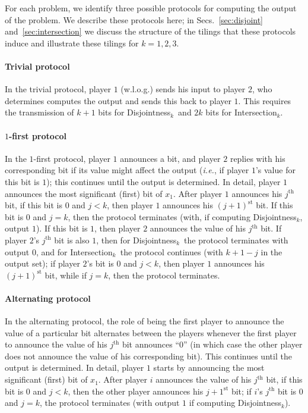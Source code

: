 \documentclass{article}
\theoremstyle{theorem}
\theoremstyle{definition}
\theoremstyle{remark}
\newcommand{\ie}{\emph{i.e.}}
\newcommand{\disjoint}{{\sc Dis\-joint\-ness}\ensuremath{_k}}
\newcommand{\intersection}{{\sc In\-ter\-sec\-tion}\ensuremath{_k}}
\begin{document}
For each problem, we identify three possible protocols for computing the output of the problem.  We describe these protocols here; in Secs.~\ref{sec:disjoint} and~\ref{sec:intersection} we discuss the structure of the tilings that these protocols induce and illustrate these tilings for $k=1,2,3$.



\paragraph{Trivial protocol} In the trivial protocol, player $1$ (w.l.o.g.) sends his input to player $2$, who determines computes the output and sends this back to player $1$.  This requires the transmission of $k+1$ bits for \disjoint\ and $2k$ bits for \intersection.


\paragraph{$1$-first protocol} In the $1$-first protocol, player $1$ announces a bit, and player $2$ replies with his corresponding bit if its value might affect the output (\ie, if player $1$'s value for this bit is $1$); this continues until the output is determined.  In detail, player $1$ announces the most significant (first) bit of $x_1$.  After player $1$ announces his $j^\mathrm{th}$ bit, if this bit is $0$ and $j<k$, then player $1$ announces his $(j+1)^\mathrm{st}$ bit.  If this bit is $0$ and $j=k$, then the protocol terminates (with, if computing \disjoint, output $1$).  If this bit is $1$, then player $2$ announces the value of his $j^\mathrm{th}$ bit.  If player $2$'s $j^\mathrm{th}$ bit is also $1$, then for \disjoint\ the protocol terminates with output $0$, and for \intersection\ the protocol continues (with $k+1-j$ in the output set); if player $2$'s bit is $0$ and $j<k$, then player $1$ announces his $(j+1)^\mathrm{st}$ bit, while if $j=k$, then the protocol terminates.

\paragraph{Alternating protocol} In the alternating protocol, the role of being the first player to announce the value of a particular bit alternates between the players whenever the first player to announce the value of his $j^\mathrm{th}$ bit announces ``$0$'' (in which case the other player does not announce the value of his corresponding bit).  This continues until the output is determined.  In detail, player $1$ starts by announcing the most significant (first) bit of $x_1$.  After player $i$ announces the value of his $j^\mathrm{th}$ bit, if this bit is $0$ and $j<k$, then the other player announces his $j+1^\mathrm{st}$ bit; if $i$'s $j^\mathrm{th}$ bit is $0$ and $j=k$, the protocol terminates (with output $1$ if computing \disjoint).
\end{document}
